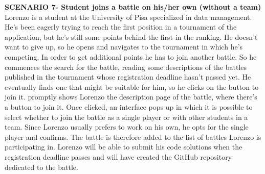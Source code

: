     \textbf{SCENARIO 7- Student joins a battle on his/her own (without a team)}\\
    Lorenzo is a student at the University of Pisa specialized in data management. He's been eagerly trying to reach the first position in a tournament of the \app application, but he's still some points behind the first in the ranking. He doesn't want to give up, so he opens \app and navigates to the tournament in which he's competing. In order to get additional points he has to join another battle. So he commences the search for the battle, reading some descriptions of the battles published in the tournament whose registration deadline hasn't passed yet. He eventually finds one that might be suitable for him, so he clicks on the button to join it. \app promptly shows Lorenzo the description page of the battle, where there's a button to join it. Once clicked, an interface pops up in which it is possible to select whether to join the battle as a single player or with other students in a team. Since Lorenzo usually prefers to work on his own, he opts for the single player and confirms.
    The battle is therefore added to the list of battles Lorenzo is participating in. Lorenzo will be able to submit his code solutions when the registration deadline passes and \app will have created the GitHub repository dedicated to the battle.\\

